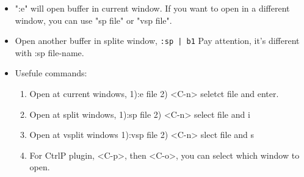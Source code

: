 \documentclass[a4paper,12pt,twoside]{book}
\begin{document}
\begin{itemize}
			\item ":e" will open buffer in current window. If you want to open in a different window, you can use "sp file" or "vsp file".

			\item Open another buffer in splite window, \texttt{:sp | b1} Pay attention, it's different with :sp file-name.

			\item Usefule commands:
				\begin{enumerate}
					\item Open at current windows, 1):e file 2) <C-n> seletct file and enter. 

					\item Open at split windows, 1):sp file 2) <C-n> select file and i

					\item Open at vsplit windows 1):vsp file 2) <C-n> slect file and s

					\item For CtrlP plugin, <C-p>, then <C-o>, you can select which window to open.
				\end{enumerate}
	\end{itemize}
\end{document}
